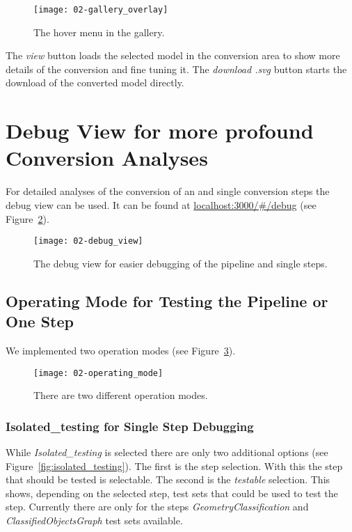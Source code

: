 \documentclass[../ClassicThesis.tex]{subfiles}
\begin{document}
\begin{figure}
  \centering
  \texttt{[image: 02-gallery\_overlay]}
  \caption{The hover menu in the gallery.}
  \label{fig:gallery_overlay}
\end{figure}

The \emph{view} button loads the selected model in the conversion area to show more details of the conversion and fine tuning it. The \emph{download .svg} button starts the download of the converted model directly.

\section{Debug View for more profound Conversion Analyses}

For detailed analyses of the conversion of an \threedmodel and single conversion steps the debug view can be used. It can be found at \url{localhost:3000/#/debug} (see Figure~\ref{fig:debug_view}).

\begin{figure}
  \centering
  \texttt{[image: 02-debug\_view]}
  \caption{The debug view for easier debugging of the pipeline and single steps.}
  \label{fig:debug_view}
\end{figure}

\subsection{Operating Mode for Testing the Pipeline or One Step}

We implemented two operation modes (see Figure~\ref{fig:operating_mode}).

\begin{figure}
  \centering
  \texttt{[image: 02-operating\_mode]}
  \caption{There are two different operation modes.}
  \label{fig:operating_mode}
\end{figure}

\subsubsection{Isolated\_testing for Single Step Debugging}

While \emph{Isolated\_testing} is selected there are only two additional options (see Figure~\ref{fig:isolated_testing}). The first is the step selection. With this the step that should be tested is selectable. The second is the \emph{testable} selection. This shows, depending on the selected step, test sets that could be used to test the step. Currently there are only for the steps  \emph{GeometryClassification} and  \emph{ClassifiedObjectsGraph} test sets available.
\end{document}
